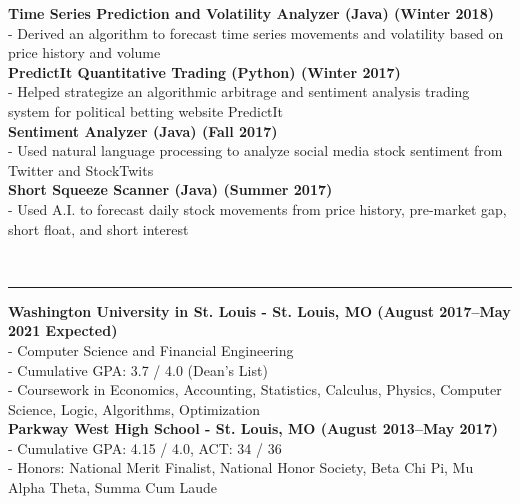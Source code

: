 \documentclass[11pt]{article}
\begin{document}
\begin{titlepage}
\begin{addmargin}[1em]{0em}
			\textbf{Time Series Prediction and Volatility Analyzer (Java) \hfill (Winter 2018)}\\
- Derived an algorithm to forecast time series movements and volatility based on price history and volume \\
			\textbf{PredictIt Quantitative Trading (Python) \hfill (Winter 2017)}\\
- Helped strategize an algorithmic arbitrage and sentiment analysis trading system for political betting website PredictIt \\
            \textbf{Sentiment Analyzer (Java) \hfill (Fall 2017)}\\	
- Used natural language processing to analyze social media stock sentiment from Twitter and StockTwits\\
			\textbf{Short Squeeze Scanner (Java) \hfill (Summer 2017)}\\
- Used A.I. to forecast daily stock movements from price history, pre-market gap, short float, and short interest\\
		\end{addmargin}
		\vspace{-10pt}
		\noindent
		\\\rule{\textwidth}{0.4pt}
		\begin{addmargin}[1em]{0em}
			\textbf{Washington University in St. Louis - St. Louis, MO \hfill (August 2017–May 2021 Expected)}\\
- Computer Science and Financial Engineering\\
- Cumulative GPA: 3.7 / 4.0 (Dean's List)\\
- Coursework in Economics, Accounting, Statistics, Calculus, Physics, Computer Science, Logic, Algorithms, Optimization \\
			\textbf{Parkway West High School - St. Louis, MO \hfill (August 2013–May 2017)}\\
- Cumulative GPA: 4.15 / 4.0, ACT: 34 / 36\\
- Honors: National Merit Finalist, National Honor Society, Beta Chi Pi, Mu Alpha Theta, Summa Cum Laude \\
		\end{addmargin}
	\end{titlepage}
\end{document}

